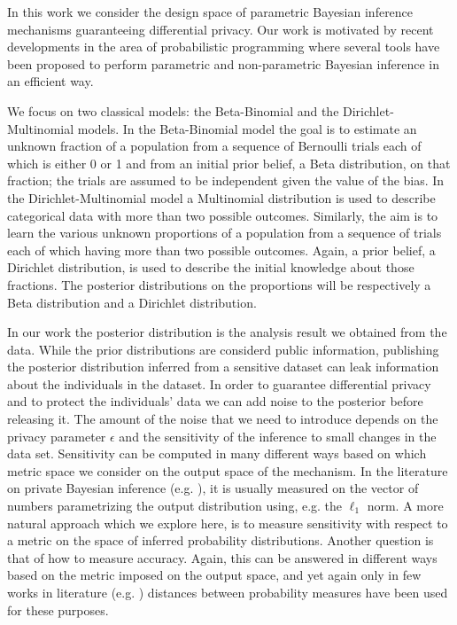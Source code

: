 \documentclass{article}
\begin{document}
In this work we consider the design space of  parametric Bayesian
inference mechanisms guaranteeing differential privacy. Our work is
motivated by recent developments in the area of probabilistic
programming where several tools have been proposed to perform
parametric and non-parametric Bayesian inference in an efficient
way.


We focus on two classical models: the Beta-Binomial and the
Dirichlet-Multinomial models. In the Beta-Binomial model the goal
is to estimate an unknown fraction of a population from a sequence
of Bernoulli trials each of which is either 0 or 1 and from an initial
prior belief, a Beta distribution, on that fraction; the trials are assumed to be independent
given the value of the bias. In the Dirichlet-Multinomial model a Multinomial
distribution is used to describe categorical data with more than
two possible outcomes. Similarly, the aim is to learn the various
unknown proportions of a population from a sequence of trials
each of which having more than two possible outcomes. Again,
a prior belief, a Dirichlet distribution, is used to describe the initial knowledge
about those fractions. The posterior distributions on the proportions will be
respectively a Beta distribution and a Dirichlet distribution.


In our work  the posterior distribution is the analysis result we obtained from the data.
While the prior distributions are considerd public information,  publishing the posterior distribution
inferred from a sensitive dataset can leak information about the individuals in the dataset.
In order to guarantee differential privacy and to protect the
individuals' data we can add noise to the posterior before releasing it.
The amount of the noise that we need to introduce
depends on the privacy parameter $\epsilon$ and the sensitivity of the inference to
small changes in the data set. 
Sensitivity can be computed in many different ways based on which metric space
we consider on the output space of the mechanism. In the literature on private Bayesian
inference (e.g. \cite{zhang2016differential,xiao2012bayesian}), it is usually measured on
the vector of numbers parametrizing the output distribution using, e.g. the $\ell_1$ norm.
A more natural approach which we explore here, is to measure sensitivity with respect to
a metric on the space of inferred probability distributions.
Another question is that of how to measure accuracy. Again,
this can be answered in different ways based on the metric
imposed on the output space, and yet again
only in few works in literature (e.g. \cite{zhang2016differential})
distances between probability measures have been used for these purposes.
\end{document}
